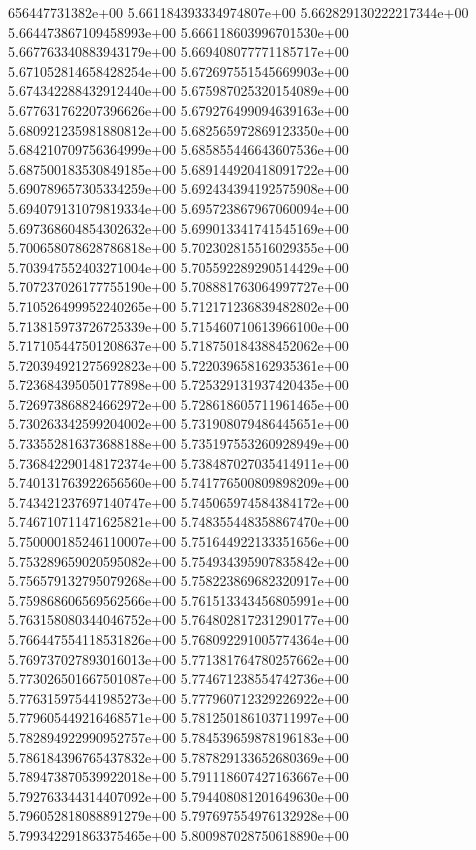 656447731382e+00	5.661184393334974807e+00	5.662829130222217344e+00	5.664473867109458993e+00	5.666118603996701530e+00	5.667763340883943179e+00	5.669408077771185717e+00	5.671052814658428254e+00	5.672697551545669903e+00	5.674342288432912440e+00	5.675987025320154089e+00	5.677631762207396626e+00	5.679276499094639163e+00	5.680921235981880812e+00	5.682565972869123350e+00	5.684210709756364999e+00	5.685855446643607536e+00	5.687500183530849185e+00	5.689144920418091722e+00	5.690789657305334259e+00	5.692434394192575908e+00	5.694079131079819334e+00	5.695723867967060094e+00	5.697368604854302632e+00	5.699013341741545169e+00	5.700658078628786818e+00	5.702302815516029355e+00	5.703947552403271004e+00	5.705592289290514429e+00	5.707237026177755190e+00	5.708881763064997727e+00	5.710526499952240265e+00	5.712171236839482802e+00	5.713815973726725339e+00	5.715460710613966100e+00	5.717105447501208637e+00	5.718750184388452062e+00	5.720394921275692823e+00	5.722039658162935361e+00	5.723684395050177898e+00	5.725329131937420435e+00	5.726973868824662972e+00	5.728618605711961465e+00	5.730263342599204002e+00	5.731908079486445651e+00	5.733552816373688188e+00	5.735197553260928949e+00	5.736842290148172374e+00	5.738487027035414911e+00	5.740131763922656560e+00	5.741776500809898209e+00	5.743421237697140747e+00	5.745065974584384172e+00	5.746710711471625821e+00	5.748355448358867470e+00	5.750000185246110007e+00	5.751644922133351656e+00	5.753289659020595082e+00	5.754934395907835842e+00	5.756579132795079268e+00	5.758223869682320917e+00	5.759868606569562566e+00	5.761513343456805991e+00	5.763158080344046752e+00	5.764802817231290177e+00	5.766447554118531826e+00	5.768092291005774364e+00	5.769737027893016013e+00	5.771381764780257662e+00	5.773026501667501087e+00	5.774671238554742736e+00	5.776315975441985273e+00	5.777960712329226922e+00	5.779605449216468571e+00	5.781250186103711997e+00	5.782894922990952757e+00	5.784539659878196183e+00	5.786184396765437832e+00	5.787829133652680369e+00	5.789473870539922018e+00	5.791118607427163667e+00	5.792763344314407092e+00	5.794408081201649630e+00	5.796052818088891279e+00	5.797697554976132928e+00	5.799342291863375465e+00	5.800987028750618890e+00
